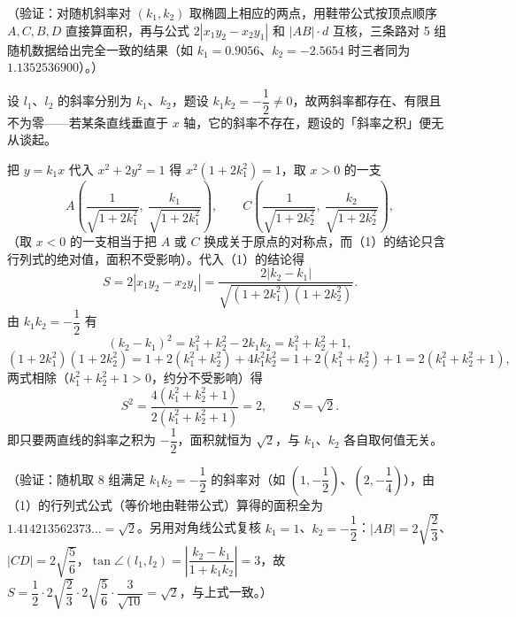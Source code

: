 \begin{answer}
（验证：对随机斜率对 \((k_{1},k_{2})\) 取椭圆上相应的两点，用鞋带公式按顶点顺序 \(A,C,B,D\) 直接算面积，再与公式 \(2|x_{1}y_{2}-x_{2}y_{1}|\) 和 \(|AB|\cdot d\) 互核，三条路对 5 组随机数据给出完全一致的结果（如 \(k_{1}=0.9056\)、\(k_{2}=-2.5654\) 时三者同为 \(1.1352536900\)）。）


设 \(l_{1}\)、\(l_{2}\) 的斜率分别为 \(k_{1}\)、\(k_{2}\)，题设 \(k_{1}k_{2}=-\dfrac{1}{2}\neq0\)，故两斜率都存在、有限且不为零——若某条直线垂直于 \(x\) 轴，它的斜率不存在，题设的「斜率之积」便无从谈起。

把 \(y=k_{1}x\) 代入 \(x^{2}+2y^{2}=1\) 得 \(x^{2}(1+2k_{1}^{2})=1\)，取 \(x>0\) 的一支
\nopagebreak[4]
\[
A\left(\frac{1}{\sqrt{1+2k_{1}^{2}}},\ \frac{k_{1}}{\sqrt{1+2k_{1}^{2}}}\right),\qquad
C\left(\frac{1}{\sqrt{1+2k_{2}^{2}}},\ \frac{k_{2}}{\sqrt{1+2k_{2}^{2}}}\right),
\]
（取 \(x<0\) 的一支相当于把 \(A\) 或 \(C\) 换成关于原点的对称点，而（1）的结论只含行列式的绝对值，面积不受影响）。代入（1）的结论得
\nopagebreak[4]
\[
S=2|x_{1}y_{2}-x_{2}y_{1}|=\frac{2|k_{2}-k_{1}|}{\sqrt{(1+2k_{1}^{2})(1+2k_{2}^{2})}}.
\]
由 \(k_{1}k_{2}=-\dfrac{1}{2}\) 有
\nopagebreak[4]
\[
(k_{2}-k_{1})^{2}=k_{1}^{2}+k_{2}^{2}-2k_{1}k_{2}=k_{1}^{2}+k_{2}^{2}+1,
\]
\nopagebreak[4]
\[
(1+2k_{1}^{2})(1+2k_{2}^{2})=1+2(k_{1}^{2}+k_{2}^{2})+4k_{1}^{2}k_{2}^{2}=1+2(k_{1}^{2}+k_{2}^{2})+1=2(k_{1}^{2}+k_{2}^{2}+1),
\]
两式相除（\(k_{1}^{2}+k_{2}^{2}+1>0\)，约分不受影响）得
\nopagebreak[4]
\[
S^{2}=\frac{4(k_{1}^{2}+k_{2}^{2}+1)}{2(k_{1}^{2}+k_{2}^{2}+1)}=2,\qquad S=\sqrt2.
\]
即只要两直线的斜率之积为 \(-\dfrac{1}{2}\)，面积就恒为 \(\sqrt2\)，与 \(k_{1}\)、\(k_{2}\) 各自取何值无关。

（验证：随机取 8 组满足 \(k_{1}k_{2}=-\dfrac{1}{2}\) 的斜率对（如 \(\left(1,-\dfrac{1}{2}\right)\)、\(\left(2,-\dfrac{1}{4}\right)\)），由（1）的行列式公式（等价地由鞋带公式）算得的面积全为 \(1.414213562373\ldots=\sqrt2\)。另用对角线公式复核 \(k_{1}=1\)、\(k_{2}=-\dfrac{1}{2}\)：\(|AB|=2\sqrt{\dfrac{2}{3}}\)、\(|CD|=2\sqrt{\dfrac{5}{6}}\)，\(\tan\angle(l_{1},l_{2})=\left|\dfrac{k_{2}-k_{1}}{1+k_{1}k_{2}}\right|=3\)，故 \(S=\dfrac{1}{2}\cdot2\sqrt{\dfrac{2}{3}}\cdot2\sqrt{\dfrac{5}{6}}\cdot\dfrac{3}{\sqrt{10}}=\sqrt2\)，与上式一致。）



\end{answer}
